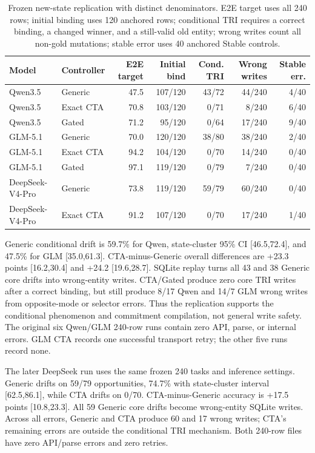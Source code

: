 \documentclass[10pt]{article}
\begin{document}
\begin{table}[h]
\centering
\small
\begin{tabular}{llrrrrr}
\toprule
Model & Controller & E2E target & Initial bind & Cond. TRI & Wrong writes & Stable err. \\
\midrule
Qwen3.5 & Generic & 47.5 & 107/120 & 43/72 & 44/240 & 4/40 \\
Qwen3.5 & Exact CTA & 70.8 & 103/120 & 0/71 & 8/240 & 6/40 \\
Qwen3.5 & Gated & 71.2 & 95/120 & 0/64 & 17/240 & 9/40 \\
GLM-5.1 & Generic & 70.0 & 120/120 & 38/80 & 38/240 & 2/40 \\
GLM-5.1 & Exact CTA & 94.2 & 104/120 & 0/70 & 14/240 & 0/40 \\
GLM-5.1 & Gated & 97.1 & 119/120 & 0/79 & 7/240 & 0/40 \\
DeepSeek-V4-Pro & Generic & 73.8 & 119/120 & 59/79 & 60/240 & 0/40 \\
DeepSeek-V4-Pro & Exact CTA & 91.2 & 107/120 & 0/70 & 17/240 & 1/40 \\
\bottomrule
\end{tabular}
\caption{Frozen new-state replication with distinct denominators. E2E target uses all 240 rows;
initial binding uses 120 anchored rows; conditional TRI requires a correct binding, a changed
winner, and a still-valid old entity; wrong writes count all non-gold mutations; stable error uses
40 anchored Stable controls.}
\end{table}

Generic conditional drift is 59.7\% for Qwen, state-cluster 95\% CI [46.5,72.4], and
47.5\% for GLM [35.0,61.3]. CTA-minus-Generic overall differences are +23.3 points
[16.2,30.4] and +24.2 [19.6,28.7]. SQLite replay turns all 43 and 38 Generic core drifts
into wrong-entity writes. CTA/Gated produce zero core TRI writes after a correct binding, but
still produce 8/17 Qwen and 14/7 GLM wrong writes from opposite-mode or selector errors. Thus
the replication supports the conditional phenomenon and commitment compilation, not general
write safety. The original six Qwen/GLM 240-row runs contain zero API, parse, or internal errors.
GLM CTA records one successful transport retry; the other five runs record none.

The later DeepSeek run uses the same frozen 240 tasks and inference settings. Generic drifts on
59/79 opportunities, 74.7\% with state-cluster interval [62.5,86.1], while CTA drifts on 0/70.
CTA-minus-Generic accuracy is +17.5 points [10.8,23.3]. All 59 Generic core drifts become
wrong-entity SQLite writes. Across all errors, Generic and CTA produce 60 and 17 wrong writes;
CTA's remaining errors are outside the conditional TRI mechanism. Both 240-row files have zero
API/parse errors and zero retries.
\end{document}

